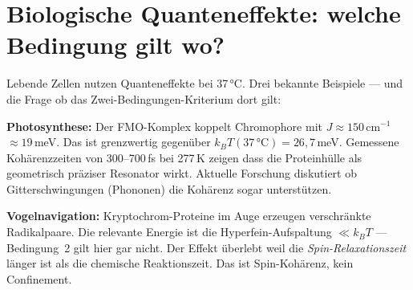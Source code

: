 \section{Biologische Quanteneffekte: welche Bedingung gilt wo?}
\label{sec:bio}

Lebende Zellen nutzen Quanteneffekte bei 37\,°C.
Drei bekannte Beispiele --- und die Frage ob das
Zwei-Bedingungen-Kriterium dort gilt:

\begin{center}
\end{center}

\textbf{Photosynthese:}
Der FMO-Komplex koppelt Chromophore mit $J \approx 150$\,cm$^{-1}$
$\approx 19$\,meV. Das ist grenzwertig gegenüber $k_BT(37\,°\text{C})
= 26{,}7$\,meV. Gemessene Kohärenzzeiten von 300--700\,fs bei 277\,K
zeigen dass die Proteinhülle als geometrisch präziser Resonator
wirkt. Aktuelle Forschung diskutiert ob Gitterschwingungen
(Phononen) die Kohärenz sogar unterstützen.

\textbf{Vogelnavigation:}
Kryptochrom-Proteine im Auge erzeugen verschränkte Radikalpaare.
Die relevante Energie ist die Hyperfein-Aufspaltung $\ll k_BT$ ---
Bedingung~2 gilt hier gar nicht. Der Effekt überlebt weil
die \emph{Spin-Relaxationszeit} länger ist als die chemische
Reaktionszeit. Das ist Spin-Kohärenz, kein Confinement.

